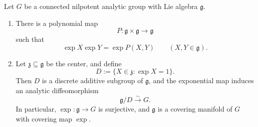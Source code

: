 \documentclass[12pt]{article}
\begin{document}
\begin{theorem}
    Let \(G\) be a connected nilpotent analytic group with Lie algebra
    \(\mathfrak g\).

    \begin{enumerate}
        \item There is a polynomial map
              \[
                  P:\mathfrak g\times \mathfrak g\to \mathfrak g
              \]
              such that
              \[
                  \exp X\exp Y=\exp P(X,Y)
                  \qquad (X,Y\in \mathfrak g).
              \]

        \item Let \(\mathfrak z\subseteq \mathfrak g\) be the center, and define
              \[
                  D:=\{X\in \mathfrak z:\exp X=1\}.
              \]
              Then \(D\) is a discrete additive subgroup of \(\mathfrak g\), and the
              exponential map induces an analytic diffeomorphism
              \[
                  \mathfrak g/D \xrightarrow{\sim} G.
              \]
              In particular, \(\exp:\mathfrak g\to G\) is surjective, and \(\mathfrak g\)
              is a covering manifold of \(G\) with covering map \(\exp\).
    \end{enumerate}
\end{theorem}
\end{document}
